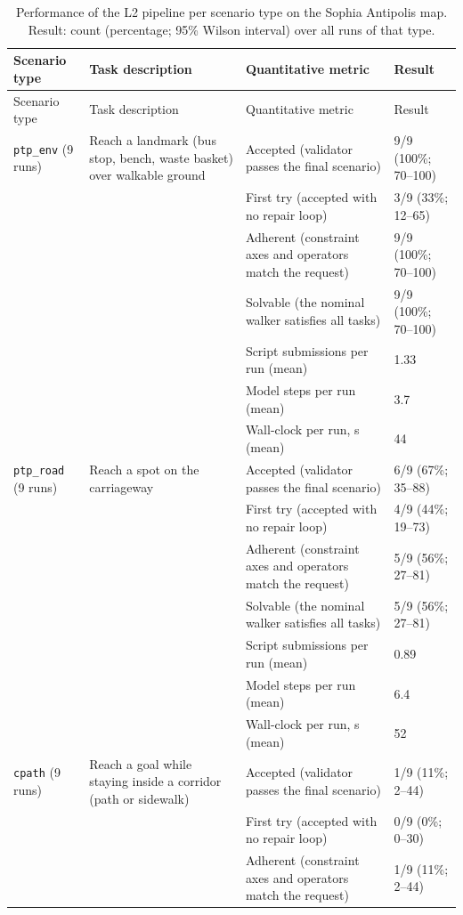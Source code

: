 \begin{longtable}{@{}p{1.7cm}p{2.9cm}p{4.4cm}p{3.1cm}@{}}
\caption{Performance of the L2 pipeline per scenario type on the Sophia Antipolis map. Result: count (percentage; 95\% Wilson interval) over all runs of that type.}\label{tab:l2_results}\\
\toprule
Scenario type & Task description & Quantitative metric & Result \\
\midrule
\endfirsthead
\toprule
Scenario type & Task description & Quantitative metric & Result \\
\midrule
\endhead
\texttt{ptp\_env} (9 runs) & Reach a landmark (bus stop, bench, waste basket) over walkable ground & Accepted (validator passes the final scenario) & 9/9 (100\%; 70--100) \\
 &  & First try (accepted with no repair loop) & 3/9 (33\%; 12--65) \\
 &  & Adherent (constraint axes and operators match the request) & 9/9 (100\%; 70--100) \\
 &  & Solvable (the nominal walker satisfies all tasks) & 9/9 (100\%; 70--100) \\
 &  & Script submissions per run (mean) & 1.33 \\
 &  & Model steps per run (mean) & 3.7 \\
 &  & Wall-clock per run, s (mean) & 44 \\
\midrule
\texttt{ptp\_road} (9 runs) & Reach a spot on the carriageway & Accepted (validator passes the final scenario) & 6/9 (67\%; 35--88) \\
 &  & First try (accepted with no repair loop) & 4/9 (44\%; 19--73) \\
 &  & Adherent (constraint axes and operators match the request) & 5/9 (56\%; 27--81) \\
 &  & Solvable (the nominal walker satisfies all tasks) & 5/9 (56\%; 27--81) \\
 &  & Script submissions per run (mean) & 0.89 \\
 &  & Model steps per run (mean) & 6.4 \\
 &  & Wall-clock per run, s (mean) & 52 \\
\midrule
\texttt{cpath} (9 runs) & Reach a goal while staying inside a corridor (path or sidewalk) & Accepted (validator passes the final scenario) & 1/9 (11\%; 2--44) \\
 &  & First try (accepted with no repair loop) & 0/9 (0\%; 0--30) \\
 &  & Adherent (constraint axes and operators match the request) & 1/9 (11\%; 2--44) \\

\end{longtable}
